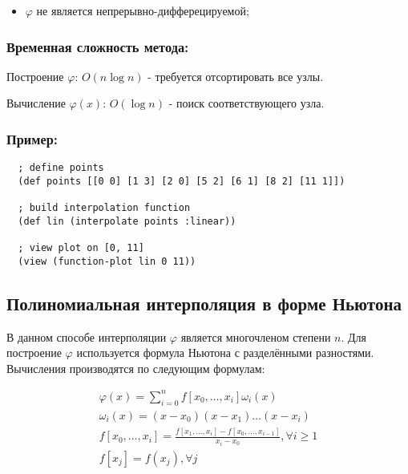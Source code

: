 \begin{itemize}
\item $\varphi$ не является непрерывно-дифферецируемой;
\end{itemize}

\subsubsection{Временная сложность метода:}

Построение $\varphi$: $ O(n \log n)$ - требуется отсортировать все узлы.

Вычисление $\varphi(x)$: $O(\log n)$ - поиск соответствующего узла.

\subsubsection{Пример:}

\begin{verbatim}
  ; define points
  (def points [[0 0] [1 3] [2 0] [5 2] [6 1] [8 2] [11 1]])

  ; build interpolation function
  (def lin (interpolate points :linear))

  ; view plot on [0, 11]
  (view (function-plot lin 0 11))
\end{verbatim}



\subsection{Полиномиальная интерполяция в форме Ньютона}

В данном способе интерполяции $\varphi$ является многочленом степени $n$. Для построение $\varphi$ используется формула Ньютона с разделёнными разностями. Вычисления производятся по следующим формулам:

\begin{equation}
  \begin{gathered}
    \varphi(x) = \sum_{i=0}^n f[x_0, \dotsc, x_i] \omega_i(x) \\
    \omega_i(x) = (x - x_0)(x - x_1) \dotsc (x - x_i) \\
    f[x_0, \dotsc, x_i] = \frac{f[x_1, \dotsc, x_i] - f[x_0, \dotsc, x_{i-1}]}{x_i - x_0}, \forall i \geq 1 \\
    f[x_j] = f(x_j), \forall j
  \end{gathered}
\end{equation}

